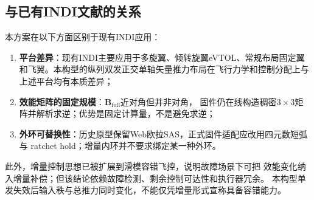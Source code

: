 \subsection{与已有INDI文献的关系}

本方案在以下方面区别于现有INDI应用：
\begin{enumerate}[label=(\arabic*)]
    \item \textbf{平台差异}：现有INDI主要应用于多旋翼\cite{smeur2016incremental}、倾转旋翼eVTOL\cite{schlatter2024longitudinal,bhandari2024design}、常规布局固定翼\cite{grondman2018design}和飞翼\cite{jiang2026enhanced}。本构型的纵列双发正交单轴矢量推力布局在飞行力学和控制分配上与上述平台均有本质差异；
    \item \textbf{效能矩阵的固定规模}：$\mathbf B_{\mathrm{full}}$近对角但并非对角，
          固件仍在线构造稠密$3\times3$矩阵并解析求逆；优势是固定计算量，不是避免求逆；
    \item \textbf{外环可替换性}：历史原型保留Web欧拉SAS，正式固件适配应改用四元数短弧与
          ratchet hold；增量内环并不要求绑定某一种外环。
\end{enumerate}
此外，增量控制思想已被扩展到滑模容错飞控\cite{wang2019incremental}，说明故障场景下可把
效能变化纳入增量补偿；但该结论依赖故障检测、剩余控制可达性和执行器冗余。
本构型单发失效后输入秩与总推力同时变化，不能仅凭增量形式宣称具备容错能力。
